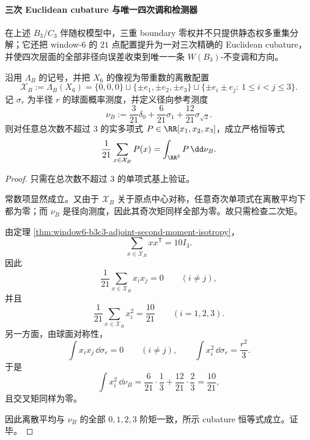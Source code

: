 \paragraph{三次 Euclidean cubature 与唯一四次调和检测器}
在上述 \(B_3/C_3\) 伴随权模型中，三重 boundary 零权并不只提供静态权多重集分解；它还把 window-\(6\) 的 \(21\) 点配置提升为一对三次精确的 Euclidean cubature，并使四次层面的全部非径向误差收束到唯一一条 \(W(B_3)\)-不变调和方向。

\begin{theorem}\label{thm:window6-b3-degree3-euclidean-cubature}
沿用 \(\Lambda_B\) 的记号，并把 \(X_6\) 的像视为带重数的离散配置
\[
\mathcal X_B:=\Lambda_B(X_6)
=
\{0,0,0\}\sqcup \{\pm e_1,\pm e_2,\pm e_3\}\sqcup \{\pm e_i\pm e_j:\ 1\le i<j\le 3\}.
\]
记 \(\sigma_r\) 为半径 \(r\) 的球面概率测度，并定义径向参考测度
\[
\nu_B:=\frac{3}{21}\delta_0+\frac{6}{21}\sigma_1+\frac{12}{21}\sigma_{\sqrt2}.
\]
则对任意总次数不超过 \(3\) 的实多项式 \(P\in\RR[x_1,x_2,x_3]\)，成立严格恒等式
\[
\frac1{21}\sum_{x\in \mathcal X_B}P(x)=\int_{\RR^3}P\,\dd\nu_B.
\]
\end{theorem}
\begin{proof}
只需在总次数不超过 \(3\) 的单项式基上验证。

常数项显然成立。又由于 \(\mathcal X_B\) 关于原点中心对称，任意奇次单项式在离散平均下都为零；而 \(\nu_B\) 是径向测度，因此其奇次矩同样全部为零。故只需检查二次矩。

由定理 \ref{thm:window6-b3c3-adjoint-second-moment-isotropy}，
\[
\sum_{x\in\mathcal X_B}xx^{\mathsf T}=10I_3.
\]
因此
\[
\frac1{21}\sum_{x\in\mathcal X_B}x_ix_j=0
\qquad(i\neq j),
\]
并且
\[
\frac1{21}\sum_{x\in\mathcal X_B}x_i^2=\frac{10}{21}
\qquad(i=1,2,3).
\]
另一方面，由球面对称性，
\[
\int x_ix_j\,\dd\sigma_r=0\qquad(i\neq j),
\qquad
\int x_i^2\,\dd\sigma_r=\frac{r^2}{3}.
\]
于是
\[
\int x_i^2\,\dd\nu_B
=
\frac{6}{21}\cdot\frac13+\frac{12}{21}\cdot\frac23
=
\frac{10}{21},
\]
且交叉矩同样为零。

因此离散平均与 \(\nu_B\) 的全部 \(0,1,2,3\) 阶矩一致，所示 cubature 恒等式成立。证毕。
\end{proof}

